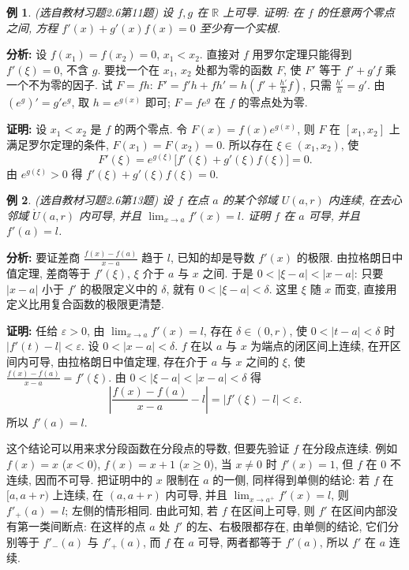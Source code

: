 \documentclass[UTF8,openany]{ctexbook}
\theoremstyle{chinesetextbook}
\newtheorem{example}{例}[section]
\newenvironment{cnproof}{\par\indent\textbf{证明:} \ignorespaces}{\par}
\begin{document}
\begin{example}\label{ex:c2-h6-11}
\textnormal{(选自教材习题2.6第11题)} 设 $f,g$ 在 $\mathbb R$ 上可导. 证明: 在 $f$ 的任意两个零点之间, 方程 $f'(x)+g'(x)f(x)=0$ 至少有一个实根.
\end{example}
\par\indent\textbf{分析:} 设 $f(x_1)=f(x_2)=0$, $x_1<x_2$. 直接对 $f$ 用罗尔定理只能得到 $f'(\xi)=0$, 不含 $g$. 要找一个在 $x_1$, $x_2$ 处都为零的函数 $F$, 使 $F'$ 等于 $f'+g'f$ 乘一个不为零的因子. 试 $F=fh$: $\displaystyle F'=f'h+fh'=h\left(f'+\frac{h'}hf\right)$, 只需 $\displaystyle\frac{h'}h=g'$. 由 $(e^{g})'=g'e^{g}$, 取 $h=e^{g(x)}$ 即可; $F=fe^{g}$ 在 $f$ 的零点处为零.
\begin{cnproof}
设 $x_1<x_2$ 是 $f$ 的两个零点. 令 $F(x)=f(x)e^{g(x)}$, 则 $F$ 在 $[x_1,x_2]$ 上满足罗尔定理的条件, $F(x_1)=F(x_2)=0$. 所以存在 $\xi\in(x_1,x_2)$, 使
\[
F'(\xi)=e^{g(\xi)}\bigl[f'(\xi)+g'(\xi)f(\xi)\bigr]=0.
\]
由 $e^{g(\xi)}>0$ 得 $f'(\xi)+g'(\xi)f(\xi)=0$.
\end{cnproof}
\begin{example}\label{ex:c2-h6-13}
\textnormal{(选自教材习题2.6第13题)} 设 $f$ 在点 $a$ 的某个邻域 $U(a,r)$ 内连续, 在去心邻域 $\mathring U(a,r)$ 内可导, 并且 $\displaystyle\lim_{x\to a}f'(x)=l$. 证明 $f$ 在 $a$ 可导, 并且 $f'(a)=l$.
\end{example}
\par\indent\textbf{分析:} 要证差商 $\displaystyle\frac{f(x)-f(a)}{x-a}$ 趋于 $l$, 已知的却是导数 $f'(x)$ 的极限. 由拉格朗日中值定理, 差商等于 $f'(\xi)$, $\xi$ 介于 $a$ 与 $x$ 之间. 于是 $0<|\xi-a|<|x-a|$: 只要 $|x-a|$ 小于 $f'$ 的极限定义中的 $\delta$, 就有 $0<|\xi-a|<\delta$. 这里 $\xi$ 随 $x$ 而变, 直接用定义比用复合函数的极限更清楚.
\begin{cnproof}
任给 $\varepsilon>0$, 由 $\displaystyle\lim_{x\to a}f'(x)=l$, 存在 $\delta\in(0,r)$, 使 $0<|t-a|<\delta$ 时 $|f'(t)-l|<\varepsilon$. 设 $0<|x-a|<\delta$. $f$ 在以 $a$ 与 $x$ 为端点的闭区间上连续, 在开区间内可导, 由拉格朗日中值定理, 存在介于 $a$ 与 $x$ 之间的 $\xi$, 使 $\displaystyle\frac{f(x)-f(a)}{x-a}=f'(\xi)$. 由 $0<|\xi-a|<|x-a|<\delta$ 得
\[
\left|\frac{f(x)-f(a)}{x-a}-l\right|=|f'(\xi)-l|<\varepsilon.
\]
所以 $f'(a)=l$.
\end{cnproof}
这个结论可以用来求分段函数在分段点的导数, 但要先验证 $f$ 在分段点连续. 例如 $f(x)=x$ ($x<0$), $f(x)=x+1$ ($x\ge0$), 当 $x\ne0$ 时 $f'(x)=1$, 但 $f$ 在 $0$ 不连续, 因而不可导. 把证明中的 $x$ 限制在 $a$ 的一侧, 同样得到单侧的结论: 若 $f$ 在 $[a,a+r)$ 上连续, 在 $(a,a+r)$ 内可导, 并且 $\displaystyle\lim_{x\to a^+}f'(x)=l$, 则 $f'_+(a)=l$; 左侧的情形相同. 由此可知, 若 $f$ 在区间上可导, 则 $f'$ 在区间内部没有第一类间断点: 在这样的点 $a$ 处 $f'$ 的左、右极限都存在, 由单侧的结论, 它们分别等于 $f'_-(a)$ 与 $f'_+(a)$, 而 $f$ 在 $a$ 可导, 两者都等于 $f'(a)$, 所以 $f'$ 在 $a$ 连续.
\end{document}
